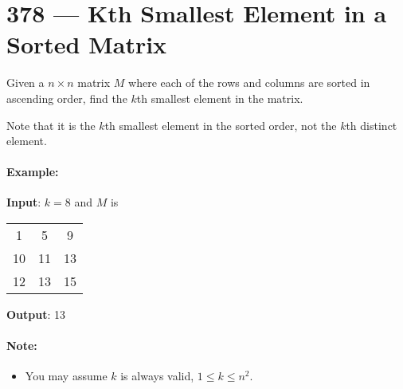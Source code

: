 \section{378 --- Kth Smallest Element in a Sorted Matrix}
Given a $ n \times n $ matrix $M$ where each of the rows and columns are sorted in ascending order, find the $k$th smallest element in the matrix.
\par
Note that it is the $k$th smallest element in the sorted order, not the $k$th distinct element.

\paragraph{Example:}
\begin{flushleft}
\textbf{Input}: $k=8$ and $M$ is 
\begin{table}[H]
\begin{tabular}{ccc}
1 & 5 & 9\\
10 & 11 & 13\\
12 & 13 & 15
\end{tabular}
\end{table}
\textbf{Output}: 13
\end{flushleft}

\paragraph{Note: }
\begin{itemize}
\item You may assume $ k $ is always valid, $ 1 \leq k \leq n^2 $.
\end{itemize}


